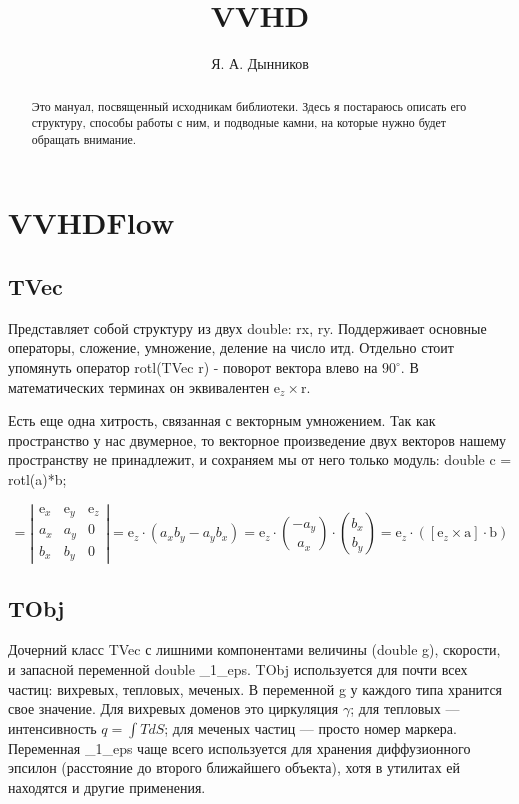 \documentclass[a4paper,14pt]{extreport}
\title{VVHD}
\author{Я. А. Дынников}
\newcommand{\br}[1]{\boldsymbol{\mathrm{#1}}}
\begin{document}
\maketitle

\begin{abstract}
Это мануал, посвященный исходникам библиотеки. Здесь я постараюсь 
описать его структуру, способы работы с ним, и подводные камни, 
на которые нужно будет обращать внимание.
\end{abstract}

\chapter{VVHDFlow}

\section{TVec}
Представляет собой структуру из двух double: rx, ry.
Поддерживает основные операторы, сложение, умножение, деление на число итд.
Отдельно стоит упомянуть оператор rotl(TVec $\br r$) - поворот вектора влево на $90^{\circ}$. В математических терминах он эквивалентен $\br e_z \times \br r$.

Есть еще одна хитрость, связанная с векторным умножением. Так как пространство у нас двумерное, то векторное произведение двух векторов нашему пространству не принадлежит, и сохраняем мы от него только модуль: double c = rotl(a)*b;

\begin{equation*}
[\br a \times \br b] = \left|\begin{array}{ccc}
\br e_x & \br e_y & \br e_z \\
a_x & a_y & 0 \\
b_x & b_y & 0 \end{array}\right| = \br e_z \cdot (a_x b_y - a_y b_x) = \br e_z \cdot \binom{-a_y}{a_x} \cdot \binom{b_x}{b_y} = \br e_z \cdot \left( [\br e_z \times \br a] \cdot \br b \right)
\end{equation*}

\section{TObj}
Дочерний класс TVec с лишними компонентами величины (double g), скорости, и запасной переменной double \_1\_eps. TObj используется для почти всех частиц: вихревых, тепловых, меченых. В переменной g у каждого типа хранится свое значение. Для вихревых доменов это циркуляция $\gamma$; для тепловых --- интенсивность $q = \int TdS$; для меченых частиц --- просто номер маркера. Переменная \_1\_eps чаще всего используется для хранения диффузионного эпсилон (расстояние до второго ближайшего объекта), хотя в утилитах ей находятся и другие применения.
\end{document}
